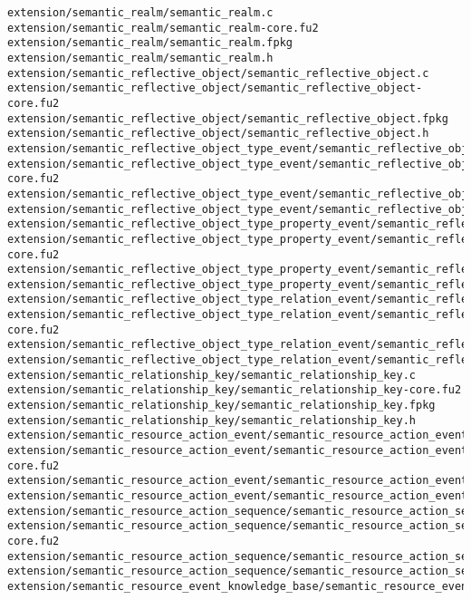 \begin{lstlisting}
extension/semantic_realm/semantic_realm.c
extension/semantic_realm/semantic_realm-core.fu2
extension/semantic_realm/semantic_realm.fpkg
extension/semantic_realm/semantic_realm.h
extension/semantic_reflective_object/semantic_reflective_object.c
extension/semantic_reflective_object/semantic_reflective_object-core.fu2
extension/semantic_reflective_object/semantic_reflective_object.fpkg
extension/semantic_reflective_object/semantic_reflective_object.h
extension/semantic_reflective_object_type_event/semantic_reflective_object_type_event.c
extension/semantic_reflective_object_type_event/semantic_reflective_object_type_event-core.fu2
extension/semantic_reflective_object_type_event/semantic_reflective_object_type_event.fpkg
extension/semantic_reflective_object_type_event/semantic_reflective_object_type_event.h
extension/semantic_reflective_object_type_property_event/semantic_reflective_object_type_property_event.c
extension/semantic_reflective_object_type_property_event/semantic_reflective_object_type_property_event-core.fu2
extension/semantic_reflective_object_type_property_event/semantic_reflective_object_type_property_event.fpkg
extension/semantic_reflective_object_type_property_event/semantic_reflective_object_type_property_event.h
extension/semantic_reflective_object_type_relation_event/semantic_reflective_object_type_relation_event.c
extension/semantic_reflective_object_type_relation_event/semantic_reflective_object_type_relation_event-core.fu2
extension/semantic_reflective_object_type_relation_event/semantic_reflective_object_type_relation_event.fpkg
extension/semantic_reflective_object_type_relation_event/semantic_reflective_object_type_relation_event.h
extension/semantic_relationship_key/semantic_relationship_key.c
extension/semantic_relationship_key/semantic_relationship_key-core.fu2
extension/semantic_relationship_key/semantic_relationship_key.fpkg
extension/semantic_relationship_key/semantic_relationship_key.h
extension/semantic_resource_action_event/semantic_resource_action_event.c
extension/semantic_resource_action_event/semantic_resource_action_event-core.fu2
extension/semantic_resource_action_event/semantic_resource_action_event.fpkg
extension/semantic_resource_action_event/semantic_resource_action_event.h
extension/semantic_resource_action_sequence/semantic_resource_action_sequence.c
extension/semantic_resource_action_sequence/semantic_resource_action_sequence-core.fu2
extension/semantic_resource_action_sequence/semantic_resource_action_sequence.fpkg
extension/semantic_resource_action_sequence/semantic_resource_action_sequence.h
extension/semantic_resource_event_knowledge_base/semantic_resource_event_knowledge_base.c

\end{lstlisting}
